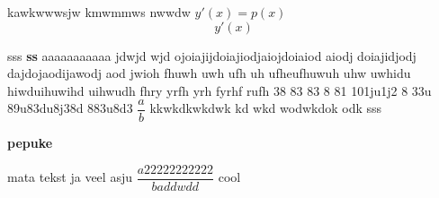 \documentclass{article}
\begin{document}
kawkwwwsjw kmwmmws nwwdw $y'(x) = p(x) $ 
\[ y'(x) \] 

sss 
\textbf{ss} 
aaaaaaaaaaa jdwjd wjd ojoiajijdoiajiodjaiojdoiaiod aiodj doiajidjodj dajdojaodijawodj aod jwioh fhuwh uwh ufh uh ufheufhuwuh uhw uwhidu hiwduihuwihd uihwudh fhry yrfh yrh fyrhf rufh 38 83 83 8 81 101ju1j2 8 33u 89u83du8j38d 883u8d3 $\dfrac{a}{b} $ kkwkdkwkdwk kd wkd wodwkdok odk sss 

\textbf{pepuke} 

mata tekst ja veel asju $\dfrac{a22222222222}{baddwdd} $ cool 
\end{document}

